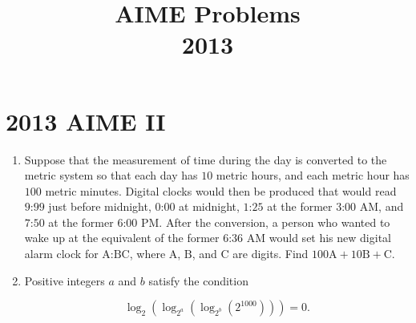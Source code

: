 \documentclass{article}
\title{AIME Problems \\ 2013}
\date{}
\begin{document}
\maketitle\thispagestyle{fancy}\newpage\section*{2013 AIME II}\begin{enumerate}[label=\arabic*., itemsep=0.5em]\item Suppose that the measurement of time during the day is converted to the metric system so that each day has \(10\) metric hours, and each metric hour has \(100\) metric minutes. Digital clocks would then be produced that would read \(\text{9:99}\) just before midnight, \(\text{0:00}\) at midnight, \(\text{1:25}\) at the former \(\text{3:00}\) AM, and \(\text{7:50}\) at the former \(\text{6:00}\) PM. After the conversion, a person who wanted to wake up at the equivalent of the former \(\text{6:36}\) AM would set his new digital alarm clock for \(\text{A:BC}\), where \(\text{A}\), \(\text{B}\), and \(\text{C}\) are digits. Find \(100\text{A}+10\text{B}+\text{C}\).\par \vspace{0.5em}\item Positive integers \(a\) and \(b\) satisfy the condition

\begin{equation*}
\log_2(\log_{2^a}(\log_{2^b}(2^{1000}))) = 0.
\end{equation*}


\end{enumerate}
\end{document}
